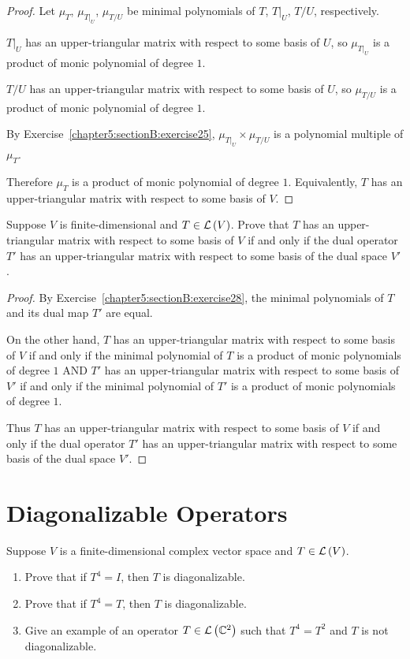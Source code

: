 \begin{proof}
    Let $\mu_{T}$, $\mu_{T\vert_{U}}$, $\mu_{T/U}$ be minimal polynomials of $T$, $T\vert_{U}$, $T/U$, respectively.

    $T\vert_{U}$ has an upper-triangular matrix with respect to some basis of $U$, so $\mu_{T\vert_{U}}$ is a product of monic polynomial of degree $1$.

    $T/U$ has an upper-triangular matrix with respect to some basis of $U$, so $\mu_{T/U}$ is a product of monic polynomial of degree $1$.

    By Exercise~\ref{chapter5:sectionB:exercise25}, $\mu_{T\vert_{U}}\times \mu_{T/U}$ is a polynomial multiple of $\mu_{T}$.

    Therefore $\mu_{T}$ is a product of monic polynomial of degree $1$. Equivalently, $T$ has an upper-triangular matrix with respect to some basis of $V$.
\end{proof}
\newpage

\begin{exercise}
    Suppose $V$ is finite-dimensional and $T \in \mathcal{L}\left({V}\right)$. Prove that $T$ has an upper-triangular matrix with respect to some basis of $V$ if and only if the dual operator $T'$ has an upper-triangular matrix with respect to some basis of the dual space $V'$.
\end{exercise}

\begin{proof}
    By Exercise~\ref{chapter5:sectionB:exercise28}, the minimal polynomials of $T$ and its dual map $T'$ are equal.

    On the other hand, $T$ has an upper-triangular matrix with respect to some basis of $V$ if and only if the minimal polynomial of $T$ is a product of monic polynomials of degree $1$ AND $T'$ has an upper-triangular matrix with respect to some basis of $V'$ if and only if the minimal polynomial of $T'$ is a product of monic polynomials of degree $1$.

    Thus $T$ has an upper-triangular matrix with respect to some basis of $V$ if and only if the dual operator $T'$ has an upper-triangular matrix with respect to some basis of the dual space $V'$.
\end{proof}
\newpage

\section{Diagonalizable Operators}

\begin{exercise}
    Suppose $V$ is a finite-dimensional complex vector space and $T\in\mathcal{L}\left({V}\right)$.
    \begin{enumerate}[label={(\alph*)}]
        \item Prove that if $T^{4} = I$, then $T$ is diagonalizable.
        \item Prove that if $T^{4} = T$, then $T$ is diagonalizable.
        \item Give an example of an operator $T\in\mathcal{L}\left({\mathbb{C}^{2}}\right)$ such that $T^{4} = T^{2}$ and $T$ is not diagonalizable.
    \end{enumerate}
\end{exercise}

